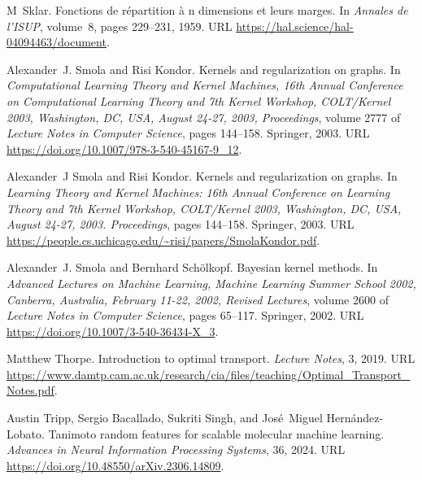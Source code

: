 \begin{thebibliography}{76}
M~Sklar.
\newblock Fonctions de r{\'e}partition {\`a} n dimensions et leurs marges.
\newblock In \emph{Annales de l'ISUP}, volume~8, pages 229--231, 1959.
\newblock URL \url{https://hal.science/hal-04094463/document}.

Alexander~J. Smola and Risi Kondor.
\newblock Kernels and regularization on graphs.
\newblock In \emph{Computational Learning Theory and Kernel Machines, 16th Annual Conference on Computational Learning Theory and 7th Kernel Workshop, COLT/Kernel 2003, Washington, DC, USA, August 24-27, 2003, Proceedings}, volume 2777 of \emph{Lecture Notes in Computer Science}, pages 144--158. Springer, 2003{}.
\newblock URL \url{https://doi.org/10.1007/978-3-540-45167-9\_12}.

Alexander~J Smola and Risi Kondor.
\newblock Kernels and regularization on graphs.
\newblock In \emph{Learning Theory and Kernel Machines: 16th Annual Conference on Learning Theory and 7th Kernel Workshop, COLT/Kernel 2003, Washington, DC, USA, August 24-27, 2003. Proceedings}, pages 144--158. Springer, 2003{}.
\newblock URL \url{https://people.cs.uchicago.edu/~risi/papers/SmolaKondor.pdf}.

Alexander~J. Smola and Bernhard Sch{\"{o}}lkopf.
\newblock Bayesian kernel methods.
\newblock In \emph{Advanced Lectures on Machine Learning, Machine Learning Summer School 2002, Canberra, Australia, February 11-22, 2002, Revised Lectures}, volume 2600 of \emph{Lecture Notes in Computer Science}, pages 65--117. Springer, 2002.
\newblock URL \url{https://doi.org/10.1007/3-540-36434-X\_3}.

Matthew Thorpe.
\newblock Introduction to optimal transport.
\newblock \emph{Lecture Notes}, 3, 2019.
\newblock URL \url{https://www.damtp.cam.ac.uk/research/cia/files/teaching/Optimal_Transport_Notes.pdf}.

Austin Tripp, Sergio Bacallado, Sukriti Singh, and Jos{\'e}~Miguel Hern{\'a}ndez-Lobato.
\newblock Tanimoto random features for scalable molecular machine learning.
\newblock \emph{Advances in Neural Information Processing Systems}, 36, 2024.
\newblock URL \url{https://doi.org/10.48550/arXiv.2306.14809}.


\end{thebibliography}
